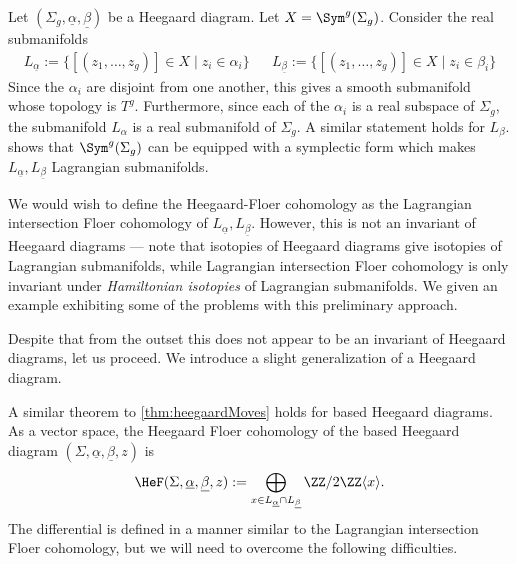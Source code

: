 
Let $(\Sigma_g, \underline{\alpha}, \underline{\beta})$ be a Heegaard diagram. Let $X=\Sym^g(\Sigma_g)$. Consider the real submanifolds
\begin{align*}
    L_{\underline \alpha}:=\{[(z_1, \ldots, z_g)]\in X\;|\; z_i\in \alpha_i\} && 
    L_{\underline \beta}:=\{[(z_1, \ldots, z_g)]\in X\;|\; z_i\in \beta_i\}
\end{align*}
Since the $\alpha_i$ are disjoint from one another, this gives a smooth submanifold whose topology is $T^g$. Furthermore, since each of the $\alpha_i$ is a real subspace of $\Sigma_g$, the submanifold $L_\alpha$ is a real submanifold of $\Sigma_g$. A similar statement holds for $L_\beta$. \Cite{perutz2008handleslide} shows that $\Sym^g(\Sigma_g)$ can be equipped with a symplectic form which makes $L_{\underline \alpha},L_{\underline \beta}$ Lagrangian submanifolds. 

We would wish to define the Heegaard-Floer cohomology as the Lagrangian intersection Floer cohomology of $L_{\underline \alpha},L_{\underline \beta}$. However, this is not an invariant of Heegaard diagrams --- note that isotopies of Heegaard diagrams give isotopies of Lagrangian submanifolds, while Lagrangian intersection Floer cohomology is only invariant under \emph{Hamiltonian isotopies} of Lagrangian submanifolds. We given an example exhibiting some of the problems with this preliminary approach.




Despite that from the outset this does not appear to be an invariant of Heegaard diagrams, let us proceed. 
We introduce a slight generalization of a Heegaard diagram. 

A similar theorem to \cref{thm:heegaardMoves} holds for based Heegaard diagrams.
As a vector space, the Heegaard Floer cohomology of the based Heegaard diagram $(\Sigma,\underline{\alpha}, \underline{\beta},z)$ is
\[\HeF(\Sigma, \underline{\alpha}, \underline{\beta},z):=\bigoplus_{x\in L_{\underline \alpha}\cap L_{\underline{\beta}}} \ZZ/2\ZZ\langle x\rangle.\]
The differential is defined in a manner similar to the Lagrangian intersection Floer cohomology, but we will need to overcome the following difficulties.

